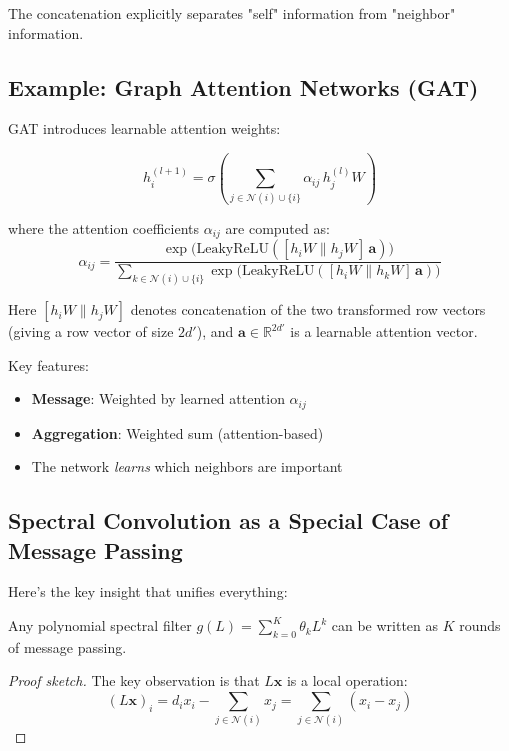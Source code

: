 \begin{notechapter}
\begin{example}
The concatenation explicitly separates "self" information from 
"neighbor" information.
\end{example}

\subsection{Example: Graph Attention Networks (GAT)}

GAT \cite{dft-to-gnn:velickovic2018graph} introduces learnable attention weights:

\begin{example}
\[
h_i^{(l+1)} = \sigma\left( \sum_{j \in \mathcal{N}(i) \cup \{i\}} 
    \alpha_{ij} \, h_j^{(l)} W \right)
\]

where the attention coefficients $\alpha_{ij}$ are computed as:
\[
\alpha_{ij} = \frac{\exp\bigl(\text{LeakyReLU}(
    [h_i W \| h_j W] \, \mathbf{a})\bigr)}
    {\sum_{k \in \mathcal{N}(i) \cup \{i\}} \exp\bigl(\text{LeakyReLU}(
    [h_i W \| h_k W] \, \mathbf{a})\bigr)}
\]

Here $[h_i W \| h_j W]$ denotes concatenation of the two transformed 
row vectors (giving a row vector of size $2d'$), and 
$\mathbf{a} \in \mathbb{R}^{2d'}$ is a learnable attention vector.

Key features:
\begin{itemize}
    \item \textbf{Message}: Weighted by learned attention $\alpha_{ij}$
    \item \textbf{Aggregation}: Weighted sum (attention-based)
    \item The network \emph{learns} which neighbors are important
\end{itemize}
\end{example}

\subsection{Spectral Convolution as a Special Case of Message Passing}

Here's the key insight that unifies everything:

\begin{theorem}
Any polynomial spectral filter $g(L) = \sum_{k=0}^{K} \theta_k L^k$ 
can be written as $K$ rounds of message passing.
\end{theorem}

\begin{proof}[Proof sketch]
The key observation is that $L\mathbf{x}$ is a local operation:
\[
(L\mathbf{x})_i = d_i x_i - \sum_{j \in \mathcal{N}(i)} x_j 
    = \sum_{j \in \mathcal{N}(i)} (x_i - x_j)
\]


\end{proof}
\end{notechapter}
